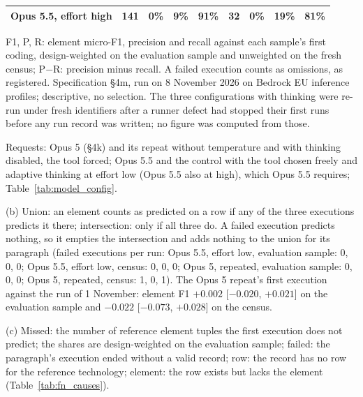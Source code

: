 \begin{table}[htbp]
\begin{threeparttable}
\begin{tabular}{@{}>{\raggedright\arraybackslash}p{42mm}rrrrrrrr@{}}
Opus 5.5, effort high & 141 & 0\% & 9\% & 91\% & 32 & 0\% & 19\% & 81\% \\
\bottomrule
\end{tabular}
\begin{tablenotes}\footnotesize
\item F1, P, R: element micro-F1, precision and recall against each sample's first coding, design-weighted on the evaluation sample and unweighted on the fresh census; P$-$R: precision minus recall. A failed execution counts as omissions, as registered. Specification \S4m, run on 8 November 2026 on Bedrock EU inference profiles; descriptive, no selection. The three configurations with thinking were re-run under fresh identifiers after a runner defect had stopped their first runs before any run record was written; no figure was computed from those.
\item Requests: Opus 5 (\S4k) and its repeat without temperature and with thinking disabled, the tool forced; Opus 5.5 and the control with the tool chosen freely and adaptive thinking at effort low (Opus 5.5 also at high), which Opus 5.5 requires; Table~\ref{tab:model_config}.
\item (b) Union: an element counts as predicted on a row if any of the three executions predicts it there; intersection: only if all three do. A failed execution predicts nothing, so it empties the intersection and adds nothing to the union for its paragraph (failed executions per run: Opus 5.5, effort low, evaluation sample: 0, 0, 0; Opus 5.5, effort low, census: 0, 0, 0; Opus 5, repeated, evaluation sample: 0, 0, 0; Opus 5, repeated, census: 1, 0, 1). The Opus 5 repeat's first execution against the run of 1 November: element F1 $+0.002$ [$-0.020$, $+0.021$] on the evaluation sample and $-0.022$ [$-0.073$, $+0.028$] on the census.
\item (c) Missed: the number of reference element tuples the first execution does not predict; the shares are design-weighted on the evaluation sample; failed: the paragraph's execution ended without a valid record; row: the record has no row for the reference technology; element: the row exists but lacks the element (Table~\ref{tab:fn_causes}).
\end{tablenotes}
\end{threeparttable}
\end{table}
